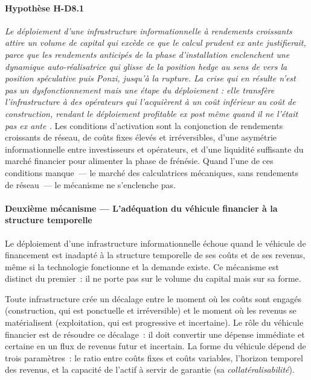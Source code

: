 \paragraph{Hypothèse H-D8.1} \emph{Le déploiement d'une infrastructure informationnelle à rendements croissants attire un volume de capital qui excède ce que le calcul prudent ex ante justifierait, parce que les rendements anticipés de la phase d'installation enclenchent une dynamique auto-réalisatrice qui glisse de la position \emph{hedge} au sens de \textcite{minsky_stabilizing_1986} vers la position spéculative puis Ponzi, jusqu'à la rupture. La crise qui en résulte n'est pas un dysfonctionnement mais une étape du déploiement : elle transfère l'infrastructure à des opérateurs qui l'acquièrent à un coût inférieur au coût de construction, rendant le déploiement profitable ex post même quand il ne l'était pas ex ante \parencite{perez_technological_2002}.} Les conditions d'activation sont la conjonction de rendements croissants de réseau, de coûts fixes élevés et irréversibles, d'une asymétrie informationnelle entre investisseurs et opérateurs, et d'une liquidité suffisante du marché financier pour alimenter la phase de frénésie. Quand l'une de ces conditions manque~--- le marché des calculatrices mécaniques, sans rendements de réseau~--- le mécanisme ne s'enclenche pas.

\paragraph{Deuxième mécanisme --- L'adéquation du véhicule financier à la structure temporelle}

Le déploiement d'une infrastructure informationnelle échoue quand le véhicule de financement est inadapté à la structure temporelle de ses coûts et de ses revenus, même si la technologie fonctionne et la demande existe. Ce mécanisme est distinct du premier~: il ne porte pas sur le volume du capital mais sur sa forme.

Toute infrastructure crée un décalage entre le moment où les coûts sont engagés (construction, qui est ponctuelle et irréversible) et le moment où les revenus se matérialisent (exploitation, qui est progressive et incertaine). Le rôle du véhicule financier est de résoudre ce décalage~: il doit convertir une dépense immédiate et certaine en un flux de revenus futur et incertain. La forme du véhicule dépend de trois paramètres~: le ratio entre coûts fixes et coûts variables, l'horizon temporel des revenus, et la capacité de l'actif à servir de garantie (sa \emph{collatéralisabilité}).

